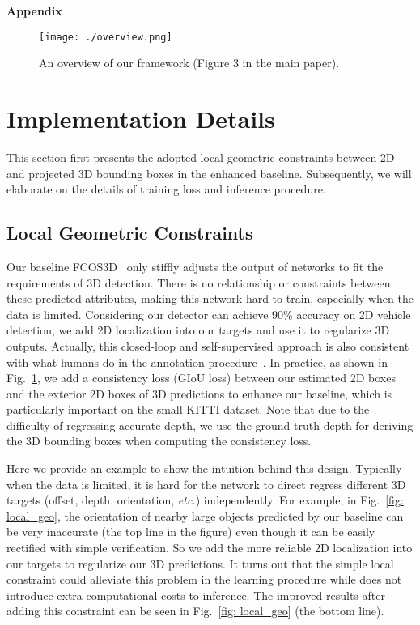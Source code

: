 

\clearpage
\begin{center}
    \Large
    \textbf{Appendix}
\end{center}

\begin{figure}[thb]
\begin{center}
\texttt{[image: ./overview.png]}
\end{center}
   \vspace{-2ex}
   \caption{An overview of our framework (Figure 3 in the main paper).}
\label{fig: apdx_overview}
\vspace{-1ex}
\end{figure}

\setcounter{section}{0}
\section{Implementation Details}
This section first presents the adopted local geometric constraints between 2D and projected 3D bounding boxes in the enhanced baseline. Subsequently, we will elaborate on the details of training loss and inference
procedure.
\subsection{Local Geometric Constraints}
Our baseline FCOS3D~\cite{FCOS3D} only stiffly adjusts the output of networks to fit the requirements of 3D detection. There is no relationship or constraints between these predicted attributes, making this network hard to train, especially when the data is limited. Considering our detector can achieve 90\% accuracy on 2D vehicle detection, we add 2D localization into our targets and use it to regularize 3D outputs. Actually, this closed-loop and self-supervised approach is also consistent with what humans do in the annotation procedure~\cite{FLAVA}. In practice, as shown in Fig.~\ref{fig: apdx_overview}, we add a consistency loss (GIoU loss) between our estimated 2D boxes and the exterior 2D boxes of 3D predictions to enhance our baseline, which is particularly important on the small KITTI dataset. Note that due to the difficulty of regressing accurate depth, we use the ground truth depth for deriving the 3D bounding boxes when computing the consistency loss.

Here we provide an example to show the intuition behind this design. Typically when the data is limited, it is hard for the network to direct regress different 3D targets (offset, depth, orientation, \emph{etc.}) independently. For example, in Fig.~\ref{fig: local_geo}, the orientation of nearby large objects predicted by our baseline can be very inaccurate (the top line in the figure) even though it can be easily rectified with simple verification. So we add the more reliable 2D localization into our targets to regularize our 3D predictions. It turns out that the simple local constraint could alleviate this problem in the learning procedure while does not introduce extra computational costs to inference. The improved results after adding this constraint can be seen in Fig.~\ref{fig: local_geo} (the bottom line).


